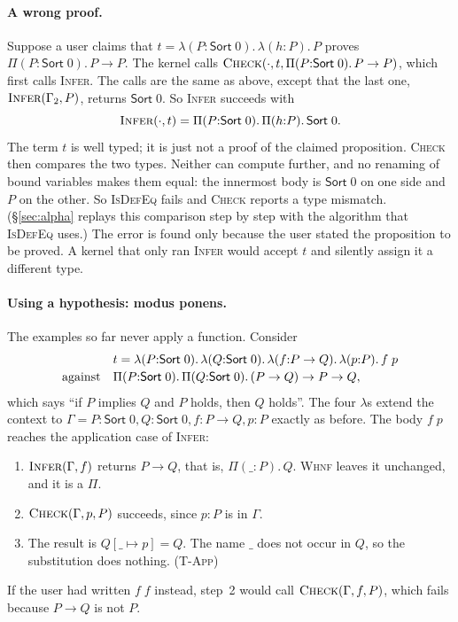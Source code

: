 \documentclass[acmsmall,screen,nonacm]{acmart}
\newcommand{\Sort}[1]{\mathsf{Sort}\;#1}
\newcommand{\tPi}[3]{\Pi(#1{:}#2).\,#3}
\newcommand{\tLam}[3]{\lambda(#1{:}#2).\,#3}
\newcommand{\subst}[3]{#1[#2 \mapsto #3]}
\begin{document}
\paragraph{A wrong proof.}
Suppose a user claims that $t = \tLam{P}{\Sort{0}}{\tLam{h}{P}{P}}$ proves $\tPi{P}{\Sort{0}}{P \to P}$.
The kernel calls $\textsc{Check}(\cdot, t, \tPi{P}{\Sort{0}}{P \to P})$, which first calls \textsc{Infer}.
The calls are the same as above, except that the last one, $\textsc{Infer}(\Gamma_2, P)$, returns $\Sort{0}$.
So \textsc{Infer} succeeds with
\[
\textsc{Infer}(\cdot, t) = \tPi{P}{\Sort{0}}{\tPi{h}{P}{\Sort{0}}}.
\]
The term $t$ is well typed; it is just not a proof of the claimed proposition.
\textsc{Check} then compares the two types.
Neither can compute further, and no renaming of bound variables makes them equal:
the innermost body is $\Sort{0}$ on one side and $P$ on the other.
So \textsc{IsDefEq} fails and \textsc{Check} reports a type mismatch.
(\S\ref{sec:alpha} replays this comparison step by step with the algorithm that \textsc{IsDefEq} uses.)
The error is found only because the user stated the proposition to be proved.
A kernel that only ran \textsc{Infer} would accept $t$ and silently assign it a different type.

\paragraph{Using a hypothesis: modus ponens.}
The examples so far never apply a function. Consider
\[
\begin{array}{r@{\quad}l}
& t = \tLam{P}{\Sort{0}}{\tLam{Q}{\Sort{0}}{\tLam{f}{P \to Q}{\tLam{p}{P}{f\;p}}}} \\[2pt]
\text{against} & \tPi{P}{\Sort{0}}{\tPi{Q}{\Sort{0}}{(P \to Q) \to P \to Q}},
\end{array}
\]
which says ``if $P$ implies $Q$ and $P$ holds, then $Q$ holds''.
The four $\lambda$s extend the context to $\Gamma = P : \Sort{0}, Q : \Sort{0}, f : P \to Q, p : P$ exactly as before.
The body $f\;p$ reaches the application case of \textsc{Infer}:
\begin{enumerate}[nosep, label=\arabic*.]
  \item $\textsc{Infer}(\Gamma, f)$ returns $P \to Q$, that is, $\tPi{\_}{P}{Q}$. \textsc{Whnf} leaves it unchanged, and it is a $\Pi$.
  \item $\textsc{Check}(\Gamma, p, P)$ succeeds, since $p : P$ is in $\Gamma$.
  \item The result is $\subst{Q}{\_}{p} = Q$. The name $\_$ does not occur in $Q$, so the substitution does nothing. \hfill (\textsc{T-App})
\end{enumerate}
If the user had written $f\;f$ instead, step~2 would call $\textsc{Check}(\Gamma, f, P)$, which fails because $P \to Q$ is not $P$.
\end{document}
